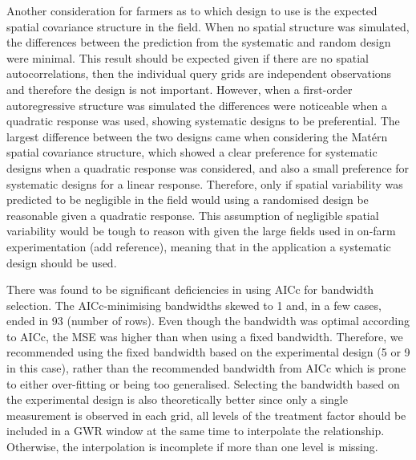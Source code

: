 \documentclass[a4paper]{article} 	%
\newcommand{\Matern}{Mat\'ern }
\begin{document}
Another consideration for farmers as to which design to use is the expected spatial covariance structure in the field. When no spatial structure was simulated, the differences between the prediction from the systematic and random design were minimal. This result should be expected given if there are no spatial autocorrelations, then the individual query grids are independent observations and therefore the design is not important. However, when a first-order autoregressive structure was simulated the differences were noticeable when a quadratic response was used, showing systematic designs to be preferential. The largest difference between the two designs came when considering the \Matern spatial covariance structure, which showed a clear preference for systematic designs when a quadratic response was considered, and also a small preference for systematic designs for a linear response. Therefore, only if spatial variability was predicted to be negligible in the field would using a randomised design be reasonable given a quadratic response. This assumption of negligible spatial variability would be tough to reason with given the large fields used in on-farm experimentation (add reference), meaning that in the application a systematic design should be used. 


There was found to be significant deficiencies in using AICc for bandwidth selection. The AICc-minimising bandwidths skewed to 1 and, in a few cases, ended in 93 (number of rows). Even though the bandwidth was optimal according to AICc, the MSE was higher than when using a fixed bandwidth. Therefore, we recommended using the fixed bandwidth based on the experimental design (5 or 9 in this case), rather than the recommended bandwidth from AICc which is prone to either over-fitting or being too generalised. Selecting the bandwidth based on the experimental design is also theoretically better since only a single measurement is observed in each grid, all levels of the treatment factor should be included in a GWR window at the same time to interpolate the %
relationship. Otherwise, the interpolation is incomplete if more than one level is missing. 
\end{document}

